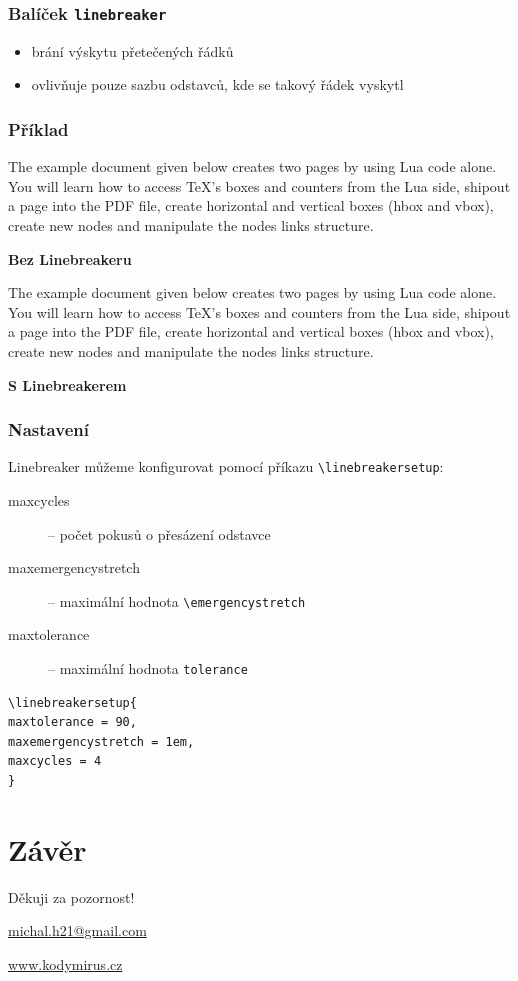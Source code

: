 \newcommand\testbox[1]{%
  \parbox{150pt}{%
    \parindent=15pt%
    \tolerance=1%
    \pretolerance=1%
    #1
  }%
}

\newcommand\printtest[1]{%
  \linebreakerdisable%
  \noindent\testbox{%
    #1
    \par\medskip\noindent\hfill\textbf{Bez Linebreakeru}\hfill\null
  }%
  \linebreakerenable%
  \hfill%
  \testbox{%
    #1
    \par\medskip\noindent\hfill\textbf{S Linebreakerem}\hfill\null
  }%
}


\begin{frame}
  \frametitle{Balíček \texttt{linebreaker}}
  \begin{itemize}
    \item brání výskytu přetečených řádků
    \item ovlivňuje pouze sazbu  odstavců, kde se takový řádek vyskytl
  \end{itemize}
\end{frame}
  
\begin{frame}
  \frametitle{Příklad}
  \printtest{
    The example document given below creates two pages by using Lua code alone. You
will learn how to access TeX's boxes and counters from the Lua side, shipout a
page into the PDF file, create horizontal and vertical boxes (hbox and vbox),
create new nodes and manipulate the nodes links structure. 
  }

\end{frame}
 
\begin{frame}[fragile]
  \frametitle{Nastavení}
  Linebreaker můžeme konfigurovat pomocí příkazu \verb|\linebreakersetup|:
  \begin{description}
    \item[maxcycles] -- počet pokusů o přesázení odstavce
    \item[maxemergencystretch] -- maximální hodnota \verb|\emergencystretch|
    \item[maxtolerance]  -- maximální hodnota \verb|tolerance|
  \end{description}
\begin{verbatim}
\linebreakersetup{
maxtolerance = 90,
maxemergencystretch = 1em,
maxcycles = 4
}
\end{verbatim}

\end{frame}

\section{Závěr}

\begin{frame}[standout]
  Děkuji za pozornost!

  \url{michal.h21@gmail.com}

  \url{www.kodymirus.cz}

\end{frame}
